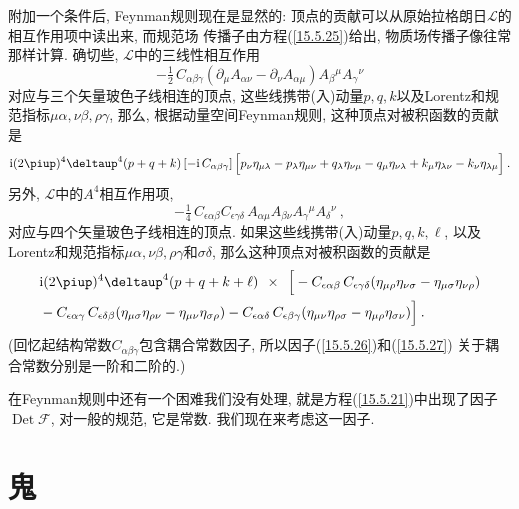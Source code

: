 附加一个条件后, Feynman规则现在是显然的: 顶点的贡献可以从原始拉格朗日$\mathscr{L}$的相互作用项中读出来, 而规范场%
传播子由方程(\ref{15.5.25})给出, 物质场传播子像往常那样计算. 确切些, $\mathscr{L}$中的三线性相互作用\[
-\tfrac{1}{2}\,C_{\alpha \beta \gamma }(\partial _{\mu }A_{\alpha \nu
}-\partial _{\nu }A_{\alpha \mu })A_{\beta }{}^{\mu }A_{\gamma }{}^{\nu }
\]%
对应与三个矢量玻色子线相连的顶点, 这些线携带(入)动量$p,q,k$以及Lorentz和规范指标$\mu \alpha ,\nu \beta ,\rho
\gamma $, 那么, 根据动量空间Feynman规则, 这种顶点对被积函数的贡献是\begin{equation}
\mi(2\uppi )^{4}\deltaup^{4}(p+q+k)\,[-\mi\,C_{\alpha \beta \gamma }]\,\Big[ p_{\nu
}\eta _{\mu \lambda }-p_{\lambda }\eta _{\mu \nu }+q_{\lambda }\eta _{\nu
\mu }-q_{\mu }\eta _{\nu \lambda }+k_{\mu }\eta _{\lambda \nu }-k_{\nu }\eta
_{\lambda \mu }\Big] \:.   \label{15.5.26}
\end{equation}%
另外, $\mathscr{L}$中的$A^{4}$相互作用项,%
\[
-\tfrac{1}{4}\,C_{\epsilon \alpha \beta }C_{\epsilon \gamma \delta }\,A_{\alpha
\mu }A_{\beta \nu }A_{\gamma }{}^{\mu }A_{\delta }{}^{\nu }\:, 
\]%
对应与四个矢量玻色子线相连的顶点. 如果这些线携带(入)动量$p,q,k,\ell $, 以及Lorentz和规范指标$\mu \alpha ,\nu \beta ,\rho \gamma $和$\sigma \delta $, 
那么这种顶点对被积函数的贡献是
\begin{align}
&\mi (2\uppi )^{4}\deltaup^{4}(p+q+k+\ell )\:\:\times \:\: \Big[ -C_{\epsilon \alpha
\beta }\,C_{\epsilon \gamma \delta }(\eta _{\mu \rho }\eta _{\nu \sigma }-\eta
_{\mu \sigma }\eta _{\nu \rho })  \nonumber \\
&-C_{\epsilon \alpha \gamma }\,C_{\epsilon \delta \beta }(\eta _{\mu \sigma
}\eta _{\rho \nu }-\eta _{\mu \nu }\eta _{\sigma \rho })-C_{\epsilon \alpha
\delta }\,C_{\epsilon \beta \gamma }(\eta _{\mu \nu }\eta _{\rho \sigma }-\eta
_{\mu \rho }\eta _{\sigma \nu })\Big]\:.   \label{15.5.27}
\end{align}%
(回忆起结构常数$C_{\alpha \beta
\gamma }$包含耦合常数因子,
所以因子(\ref{15.5.26})和(\ref{15.5.27})%
关于耦合常数分别是一阶和二阶的.)

在Feynman规则中还有一个困难我们没有处理, 就是方程(\ref{15.5.21})中出现了因子$\operatorname{Det} \mathscr{F}$, 对一般的规范, 它{}是常数.
我们现在来考虑这一因子.


\section{鬼}

